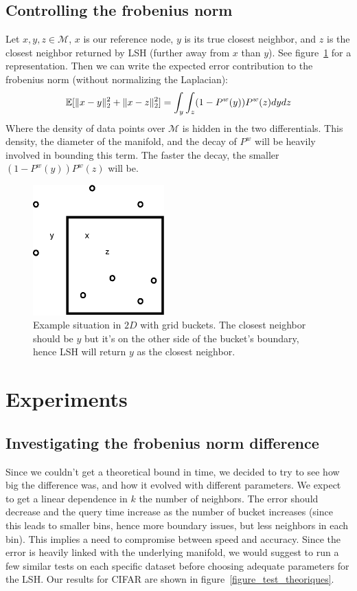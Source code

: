\documentclass{article} %
\begin{document}
\subsection{Controlling the frobenius norm}
Let $x, y, z \in \mathcal{M}$, $x$ is our reference node, $y$ is its true closest neighbor, and $z$ is the closest neighbor returned by LSH (further away from $x$ than $y$). See figure~\ref{degeu} for a representation. Then we can write the expected error contribution to the frobenius norm (without normalizing the Laplacian):
$$\mathbb{E}[\Arrowvert x-y\Arrowvert_2^2 + \Arrowvert x-z\Arrowvert_2^2] = \int_y \int_z (1-P^w(y))P^w(z)dydz$$
Where the density of data points over $\mathcal{M}$ is hidden in the two differentials. This density, the diameter of the manifold, and the decay of $P^w$ will be heavily involved in bounding this term. The faster the decay, the smaller $(1-P^w(y))P^w(z)$ will be.
\begin{figure}[ht!]
 \centering
 \includegraphics[width=0.45\textwidth]{figures/dessin_degeu.eps} 
 \caption{Example situation in $2D$ with grid buckets. The closest neighbor should be $y$ but it's on the other side of the bucket's boundary, hence LSH will return $y$ as the closest neighbor.}
 \label{degeu}
\end{figure}

\section{Experiments}

\subsection{Investigating the frobenius norm difference}
Since we couldn't get a theoretical bound in time, we decided to try to see how big the difference was, and how it evolved with different parameters. We expect to get a linear dependence in $k$ the number of neighbors. The error should decrease and the query time increase as the number of bucket increases (since this leads to smaller bins, hence more boundary issues, but less neighbors in each bin). This implies a need to compromise between speed and accuracy. Since the error is heavily linked with the underlying manifold, we would suggest to run a few similar tests on each specific dataset before choosing adequate parameters for the LSH. Our results for CIFAR are shown in figure~\ref{figure_test_theoriques}.
\end{document}
